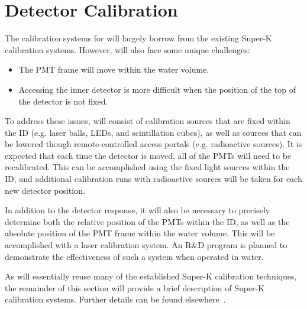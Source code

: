 \section{Detector Calibration}


The calibration systems for \nuprismlite will largely borrow from the existing Super-K calibration systems. However, \nuprismlite will also face some unique challenges:
\begin{itemize}
\item The PMT frame will move within the water volume.
\item Accessing the inner detector is more difficult when the position of the top of the detector is not fixed.
\end{itemize}
To address these issues, \nuprismlite will consist of calibration sources that are fixed within the ID (e.g. laser balls, LEDs, and scintillation cubes), as well as sources that can be lowered though remote-controlled access portals (e.g. radioactive sources). It is expected that each time the detector is moved, all of the PMTs will need to be recalibrated. This can be accomplished using the fixed light sources within the ID, and additional calibration runs with radioactive sources will be taken for each new detector position.

In addition to the detector response, it will also be necessary to precisely determine both the relative position of the PMTs within the ID, as well as the absolute position of the PMT frame within the water volume. This will be accomplished with a laser calibration system. An R\&D program is planned to demonstrate the effectiveness of such a system when operated in water.

As \nuprism will essentially reuse many of the established Super-K calibration techniques, the remainder of this section will provide a brief description of Super-K calibration systems. Further details can be found elsewhere~\cite{Fukuda:2002uc, SK_calib_paper}.

